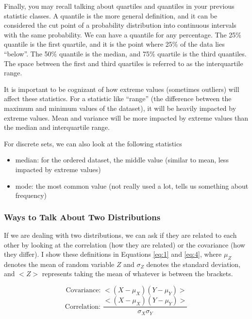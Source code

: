\documentclass{article}
\begin{document}
Finally, you may recall talking about quartiles and quantiles in your previous statistic classes. A quantile is the more general definition, and it can be considered the cut point of a probability distribution into continuous intervals with the same probability. We can have a quantile for any percentage. The 25\% quantile is the first quartile, and it is the point where 25\% of the data lies ``below''. The 50\% quantile is the median, and 75\% quartile is the third quantiles. The space between the first and third quartiles is referred to as the interquartile range. 

It is important to be cognizant of how extreme values (sometimes outliers) will affect these statistics. For a statistic like ``range'' (the difference between the maximum and minimum values of the dataset), it will be heavily impacted by extreme values. Mean and variance will be more impacted by extreme values than the median and interquartile range. 

For discrete sets, we can also look at the following statistics
\begin{itemize}
\item median: for the ordered dataset, the middle value (similar to mean, less impacted by extreme values)
\item mode: the most common value (not really used a lot, tells us something about frequency)
\end{itemize}

\subsubsection{Ways to Talk About Two Distributions}
If we are dealing with two distributions, we can ask if they are related to each other by looking at the correlation (how they are related) or the covariance (how they differ). I show these definitions in Equations \ref{eq:1} and \ref{eq:4}, where $\mu_Z$ denotes the mean of random variable $Z$ and $\sigma_Z$ denotes the standard deviation, and $<Z>$ represents taking the mean of whatever is between the brackets.

\begin{equation}
\label{eq:1}
\text{Covariance: } <\left(X - \mu_X \right) \left( Y - \mu_Y \right) >
\end{equation}
\begin{equation}
\label{eq:4}
\text{Correlation: } \frac{ <\left(X - \mu_X \right) \left( Y - \mu_Y \right) >}{\sigma_X\sigma_Y}
\end{equation}
\end{document}
